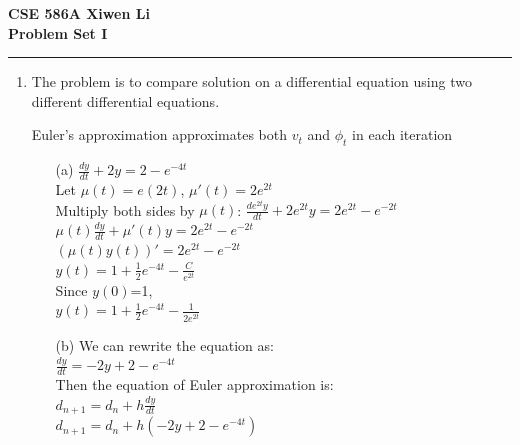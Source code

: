 \documentclass[11pt]{article}
\begin{document}
\thispagestyle{empty}
{\large{\bf CSE 586A  \hfill Xiwen Li}}\\

{\LARGE{\bf Problem Set I}}
\vspace{0.2\baselineskip}
\hrule


\begin{enumerate}
\item The problem is to compare solution on a differential equation using two different differential equations.

Euler's approximation approximates both $v_{t}$ and $\phi_{t}$ in each iteration

\begin{enumerate}

	\item[(a)] 	$\frac{dy}{dt}+2y=2-e^{-4t}$\\
	\newline
	Let $\mu(t)=e(2t)$, $\mu'(t)=2e^{2t}$\\
	\newline
	Multiply both sides by $\mu(t)$: $\frac{de^{2t}y}{dt}+2e^{2t}y=2e^{2t}-e^{-2t}$\\
	\newline
	$\mu(t)\frac{dy}{dt}+\mu'(t)y=2e^{2t}-e^{-2t}$\\
	\newline
	$(\mu(t)y(t))'=2e^{2t}-e^{-2t}$\\
	\newline
	$y(t)=1+\frac{1}{2}e^{-4t}-\frac{C}{e^{2t}}$\\
	\newline
	Since $y(0)$=1,\\
	\newline
	$y(t)=1+\frac{1}{2}e^{-4t}-\frac{1}{2e^{2t}}$\\
	
	\item[(b)] We can rewrite the equation as: \\
	\newline
	$\frac{dy}{dt}=-2y+2-e^{-4t}$\\
	\newline
	Then the equation of Euler approximation is:\\
	\newline
	$d_{n+1}=d_{n}+h\frac{dy}{dt}$\\
	$d_{n+1}=d_{n}+h(-2y+2-e^{-4t})$
	\newline
	\begin{table}[h!]
		\begin{center}
			

\end{center}
\end{table}
\end{enumerate}
\end{enumerate}
\end{document}
